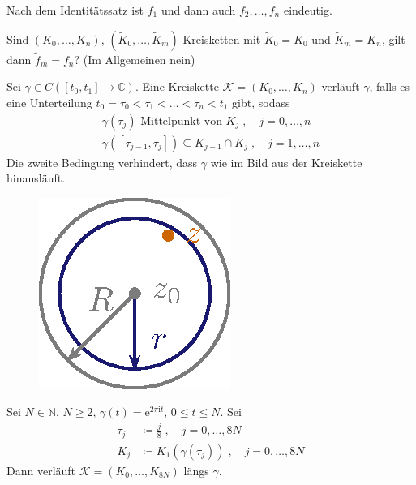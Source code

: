 \documentclass[a4paper,10pt]{scrbook}
\begin{document}
\begin{notice}
  \begin{enum-arab}
    \item  Nach dem Identitätssatz ist $f_1$ und dann auch $f_2,\ldots,f_n$ eindeutig.

    \item Sind $(K_0,\ldots,K_n)$, $(\widetilde{K}_0,\ldots,\widetilde{K}_m)$ Kreisketten mit $\widetilde{K}_0 = K_0$ und $\widetilde{K}_m = K_n$, gilt dann $\widetilde{f}_m = f_n$? (Im Allgemeinen nein)
  \end{enum-arab}
\end{notice}

\begin{theorem}[Defintion]
  Sei $\gamma \in C([t_0,t_1] \to \mathbb{C})$. Eine Kreiskette $\mathcal{K} = (K_0,\ldots,K_n)$ verläuft  $\gamma$, falls es eine Unterteilung $t_0 = \tau_0 < \tau_1 < \ldots < \tau_n < t_1$ gibt, sodass
  \begin{gather*}
    \gamma(\tau_j) \text{ Mittelpunkt von } K_j \; , \quad j = 0,\ldots,n \\
    \gamma([\tau_{j-1},\tau_{j}]) \subseteq K_{j-1} \cap K_j \; , \quad j = 1,\ldots,n
  \end{gather*}
  Die zweite Bedingung verhindert, dass $\gamma$ wie im Bild aus der Kreiskette hinausläuft.
  \begin{figure}[H]
    \centering
    \includegraphics[scale=0.2]{images/ana3-tmp-43}
  \end{figure}
\end{theorem}

\begin{example}
  Sei $N \in \mathbb{N}$, $N \geq 2$, $\gamma(t) = \mathrm{e}^{2 \pi \mathrm{i} t}$, $0 \leq t \leq N$. Sei
  \begin{align*}
    \tau_j &\coloneq \frac{j}{8} \; , \quad j = 0,\ldots,8N \\
    K_j &\coloneq K_1(\gamma(\tau_j)) \; , \quad j = 0,\ldots,8N
  \end{align*}
  Dann verläuft $\mathcal{K} = (K_0,\ldots,K_{8N})$ längs $\gamma$.
\end{example}
\end{document}
